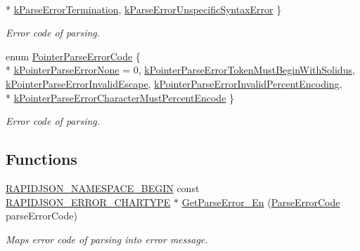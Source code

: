 \begin{DoxyCompactItemize}
\\*
\hyperlink{a00832_gga8d4b32dfc45840bca189ade2bbcb6ba7a6fed2d9a15f88540a1ba785f0de2cbe6}{k\+Parse\+Error\+Termination}, 
\hyperlink{a00832_gga8d4b32dfc45840bca189ade2bbcb6ba7a2bec6b26bddd3e093a37fc0d6399e0be}{k\+Parse\+Error\+Unspecific\+Syntax\+Error}
 \}\begin{DoxyCompactList}\small\item\em Error code of parsing. \end{DoxyCompactList}
\item 
enum \hyperlink{a00832_gacb2e274f33e54d91b96e9883a99a98be}{Pointer\+Parse\+Error\+Code} \{ \\*
\hyperlink{a00832_ggacb2e274f33e54d91b96e9883a99a98bea81e2b6fbd1bf4ac890ddb7779265e3a0}{k\+Pointer\+Parse\+Error\+None} = 0, 
\hyperlink{a00832_ggacb2e274f33e54d91b96e9883a99a98bea5821696a2ab6cbccdc8288cbe6e81c77}{k\+Pointer\+Parse\+Error\+Token\+Must\+Begin\+With\+Solidus}, 
\hyperlink{a00832_ggacb2e274f33e54d91b96e9883a99a98bea4d2a7e511d717fd1d2f532ef5fcf821b}{k\+Pointer\+Parse\+Error\+Invalid\+Escape}, 
\hyperlink{a00832_ggacb2e274f33e54d91b96e9883a99a98beac0c1b013c0db34dcc5a47fc1ee7a8c35}{k\+Pointer\+Parse\+Error\+Invalid\+Percent\+Encoding}, 
\\*
\hyperlink{a00832_ggacb2e274f33e54d91b96e9883a99a98beabd7eae93627f74267009a03679b6dc38}{k\+Pointer\+Parse\+Error\+Character\+Must\+Percent\+Encode}
 \}\begin{DoxyCompactList}\small\item\em Error code of parsing. \end{DoxyCompactList}
\end{DoxyCompactItemize}
\subsection*{Functions}
\begin{DoxyCompactItemize}
\item 
\hyperlink{a00833_gad3806c8251fdc7da9618b7e922674ffc}{R\+A\+P\+I\+D\+J\+S\+O\+N\+\_\+\+N\+A\+M\+E\+S\+P\+A\+C\+E\+\_\+\+B\+E\+G\+IN} const \hyperlink{a00832_ga7e4636fd48d0148f102b8a13f0539d8c}{R\+A\+P\+I\+D\+J\+S\+O\+N\+\_\+\+E\+R\+R\+O\+R\+\_\+\+C\+H\+A\+R\+T\+Y\+PE} $\ast$ \hyperlink{a00832_ga755b523205f46c980c80d12e230a3abd}{Get\+Parse\+Error\+\_\+\+En} (\hyperlink{a00832_ga8d4b32dfc45840bca189ade2bbcb6ba7}{Parse\+Error\+Code} parse\+Error\+Code)
\begin{DoxyCompactList}\small\item\em Maps error code of parsing into error message. \end{DoxyCompactList}\end{DoxyCompactItemize}


